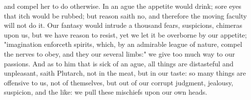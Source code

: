 {and compel her to do otherwise. In an ague the appetite would drink; sore eyes that itch would be rubbed; but reason saith no, and therefore the moving faculty will not do it. Our fantasy would intrude a thousand fears, suspicions, chimeras upon us, but we have reason to resist, yet we let it be overborne by our appetite; "imagination enforceth spirits, which, by an admirable league of nature, compel the nerves to obey, and they our several limbs:" we give too much way to our passions. And as to him that is sick of an ague, all things are distasteful and unpleasant,  saith Plutarch, not in the meat, but in our taste: so many things are offensive to us, not of themselves, but out of our corrupt judgment, jealousy, suspicion, and the like: we pull these mischiefs upon our own heads.

}

